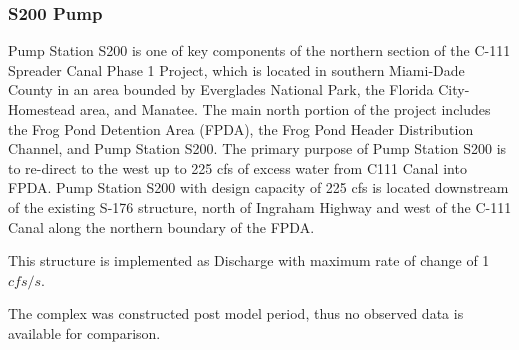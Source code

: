 %
%


\clearpage

\subsubsection{S200 Pump}
Pump Station S200 is one of key components of the northern section of the C-111 Spreader Canal Phase 1 Project, which is located in southern Miami-Dade County in an area bounded by Everglades National Park, the Florida City-Homestead area, and Manatee. The main north portion of the project includes the Frog Pond Detention Area (FPDA), the Frog Pond Header Distribution Channel, and Pump Station S200. The primary purpose of Pump Station S200 is to re-direct to the west up to 225 cfs of excess water from C111 Canal into FPDA. Pump Station S200 with design capacity of 225 cfs is located downstream of the existing S-176 structure, north of Ingraham Highway and west of the C-111 Canal along the northern boundary of the FPDA.

This structure is implemented as Discharge with maximum rate of change of 1 $cfs/s$.

The complex was constructed post model period, thus no observed data is available for comparison.

